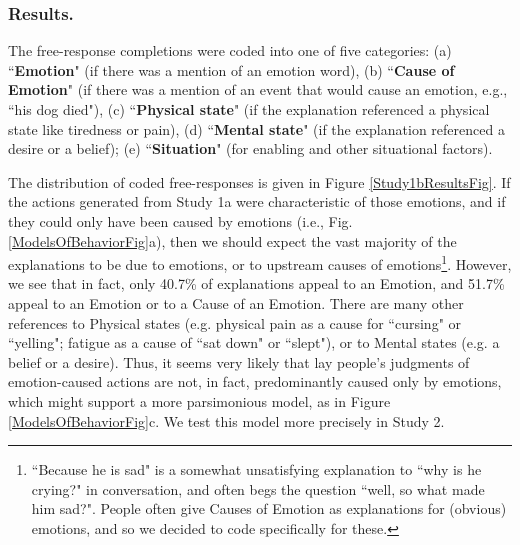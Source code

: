 \documentclass[10pt,letterpaper]{article}
\begin{document}
\subsubsection{Results.} 
The free-response completions were coded into one of five categories: (a) ``\textbf{Emotion}" (if there was a mention of an emotion word), (b) ``\textbf{Cause of Emotion}" (if there was a mention of an event that would cause an emotion, e.g., ``his dog died"), (c) ``\textbf{Physical state}" (if the explanation referenced a physical state like tiredness or pain), (d) ``\textbf{Mental state}" (if the explanation referenced a desire or a belief); (e) ``\textbf{Situation}" (for enabling and other situational factors). 

The distribution of coded free-responses is given in Figure \ref{Study1bResultsFig}. If the actions generated from Study 1a were characteristic of those emotions, and if they could only have been caused by emotions (i.e., Fig. \ref{ModelsOfBehaviorFig}a), then we should expect the vast majority of the explanations to be due to emotions, or to upstream causes of emotions\footnote{``Because he is sad" is a somewhat unsatisfying explanation to ``why is he crying?" in conversation, and often begs the question ``well, so what made him sad?". People often give Causes of Emotion as explanations for (obvious) emotions, and so we decided to code specifically for these.}. However, we see that in fact, only 40.7\% of explanations appeal to an Emotion, and 51.7\% appeal to an Emotion or to a Cause of an Emotion. There are many other references to Physical states (e.g. physical pain as a cause for ``cursing" or ``yelling"; fatigue as a cause of ``sat down" or ``slept"), or to Mental states (e.g. a belief or a desire). Thus, it seems very likely that lay people's judgments of emotion-caused actions are not, in fact, predominantly caused only by emotions, which might support a more parsimonious model, as in Figure \ref{ModelsOfBehaviorFig}c. We test this model more precisely in Study 2.
\end{document}
